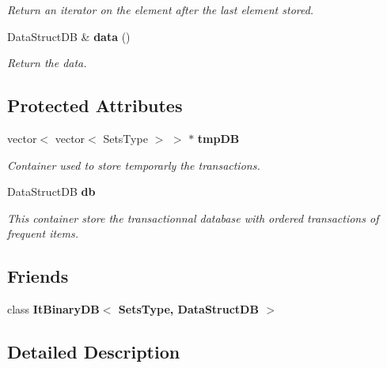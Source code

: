 \begin{CompactItemize}
\begin{CompactList}\small\item\em Return an iterator on the element after the last element stored. \item\end{CompactList}\item 
Data\-Struct\-DB \& {\bf data} ()\label{class_binary_d_b_5fe8c3783aaae5426cddb38e15de7f69}

\begin{CompactList}\small\item\em Return the data. \item\end{CompactList}\end{CompactItemize}
\subsection*{Protected Attributes}
\begin{CompactItemize}
\item 
vector$<$ vector$<$ Sets\-Type $>$ $>$ $\ast$ {\bf tmp\-DB}\label{class_binary_d_b_9790b745395cb61d823ff9d9f7a2fede}

\begin{CompactList}\small\item\em Container used to store temporarly the transactions. \item\end{CompactList}\item 
Data\-Struct\-DB {\bf db}\label{class_binary_d_b_537da5448f8c18fd4eb840db2a11c05e}

\begin{CompactList}\small\item\em This container store the transactionnal database with ordered transactions of frequent items. \item\end{CompactList}\end{CompactItemize}
\subsection*{Friends}
\begin{CompactItemize}
\item 
class {\bf It\-Binary\-DB$<$ Sets\-Type, Data\-Struct\-DB $>$}\label{class_binary_d_b_2e8afe47ac8168f1f40b08eca702ffbf}

\end{CompactItemize}


\subsection{Detailed Description}
